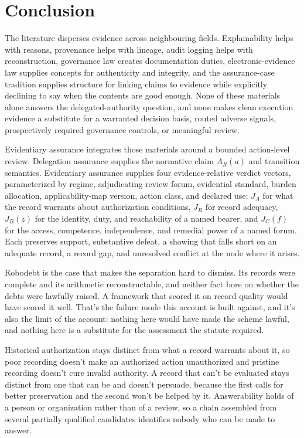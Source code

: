 \section{Conclusion}

The literature disperses evidence across neighbouring fields. Explainability helps with reasons, provenance helps with lineage, audit logging helps with reconstruction, governance law creates documentation duties, electronic-evidence law supplies concepts for authenticity and integrity, and the assurance-case tradition supplies structure for linking claims to evidence while explicitly declining to say when the contents are good enough. None of these materials alone answers the delegated-authority question, and none makes clean execution evidence a substitute for a warranted decision basis, routed adverse signals, prospectively required governance controls, or meaningful review.

Evidentiary assurance integrates those materials around a bounded action-level review. Delegation assurance supplies the normative claim \(A_R(a)\) and transition semantics. Evidentiary assurance supplies four evidence-relative verdict vectors, parameterized by regime, adjudicating review forum, evidential standard, burden allocation, applicability-map version, action class, and declared use: \(J_A\) for what the record warrants about authorization conditions, \(J_R\) for record adequacy, \(J_B(z)\) for the identity, duty, and reachability of a named bearer, and \(J_C(f)\) for the access, competence, independence, and remedial power of a named forum. Each preserves support, substantive defeat, a showing that falls short on an adequate record, a record gap, and unresolved conflict at the node where it arises.

Robodebt is the case that makes the separation hard to dismiss. Its records were complete and its arithmetic reconstructable, and neither fact bore on whether the debts were lawfully raised. A framework that scored it on record quality would have scored it well. That's the failure mode this account is built against, and it's also the limit of the account: nothing here would have made the scheme lawful, and nothing here is a substitute for the assessment the statute required.

Historical authorization stays distinct from what a record warrants about it, so poor recording doesn't make an authorized action unauthorized and pristine recording doesn't cure invalid authority. A record that can't be evaluated stays distinct from one that can be and doesn't persuade, because the first calls for better preservation and the second won't be helped by it. Answerability holds of a person or organization rather than of a review, so a chain assembled from several partially qualified candidates identifies nobody who can be made to answer.

